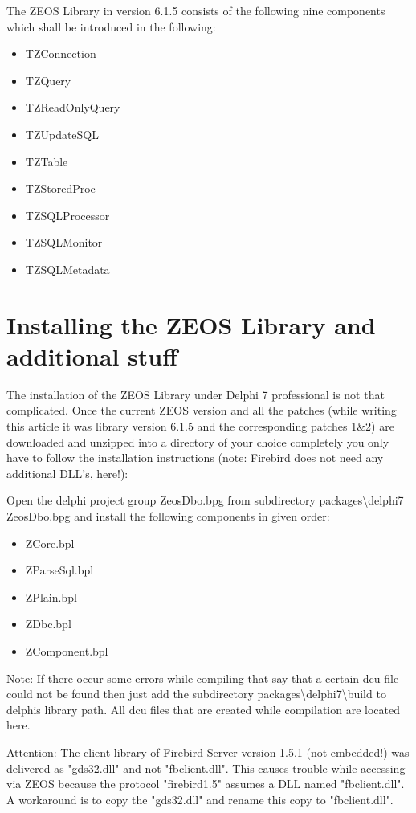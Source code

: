 \documentclass[a4paper,12pt,oneside]{book}
\begin{document}
The ZEOS Library in version 6.1.5 consists of the following nine components
which shall be introduced in the following:
\begin{itemize}
\item TZConnection
\item TZQuery
\item TZReadOnlyQuery
\item TZUpdateSQL
\item TZTable
\item TZStoredProc
\item TZSQLProcessor
\item TZSQLMonitor
\item TZSQLMetadata
\end{itemize}

\chapter{Installing the ZEOS Library and additional stuff}

The installation of the ZEOS Library under Delphi 7 professional is not that complicated.
Once the current ZEOS version and all the patches (while writing this article it was library version 6.1.5 and the corresponding patches 1\&2) are downloaded and unzipped into a directory of your choice completely you only have to follow the installation instructions (note: Firebird does not need any additional DLL's, here!):

Open the delphi project group ZeosDbo.bpg from subdirectory packages\textbackslash delphi7 ZeosDbo.bpg and install
the following components in given order:
\begin{itemize}
\item ZCore.bpl
\item ZParseSql.bpl
\item ZPlain.bpl
\item ZDbc.bpl
\item ZComponent.bpl
\end{itemize}

Note: If there occur some errors while compiling that say that a certain dcu file could not be found then just add the subdirectory packages\textbackslash delphi7\textbackslash build to delphis library path.
All dcu files that are created while compilation are located here.

Attention: The client library of Firebird Server version 1.5.1 (not embedded!) was delivered as "gds32.dll" and not "fbclient.dll".
This causes trouble while accessing via ZEOS because the protocol "firebird1.5" assumes a DLL named "fbclient.dll".
A workaround is to copy the "gds32.dll" and rename this copy to "fbclient.dll".
\end{document}
